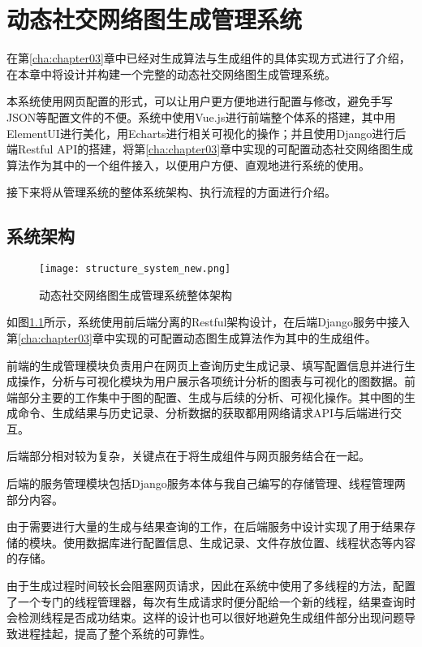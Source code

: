 
\chapter{动态社交网络图生成管理系统}
\label{cha:chapter04}

在第\ref{cha:chapter03}章中已经对生成算法与生成组件的具体实现方式进行了介绍，在本章中将设计并构建一个完整的动态社交网络图生成管理系统。

本系统使用网页配置的形式，可以让用户更方便地进行配置与修改，避免手写JSON等配置文件的不便。系统中使用Vue.js进行前端整个体系的搭建，其中用ElementUI进行美化，用Echarts进行相关可视化的操作；并且使用Django进行后端Restful API的搭建，将第\ref{cha:chapter03}章中实现的可配置动态社交网络图生成算法作为其中的一个组件接入，以便用户方便、直观地进行系统的使用。

接下来将从管理系统的整体系统架构、执行流程的方面进行介绍。

\section{系统架构}

\begin{figure}[H]
  \centering
  \texttt{[image: structure\_system\_new.png]}
  \caption{动态社交网络图生成管理系统整体架构}
  \label{fig:web_system}
\end{figure}

如图\ref{fig:web_system}所示，系统使用前后端分离的Restful架构设计，在后端Django服务中接入第\ref{cha:chapter03}章中实现的可配置动态图生成算法作为其中的生成组件。

前端的生成管理模块负责用户在网页上查询历史生成记录、填写配置信息并进行生成操作，分析与可视化模块为用户展示各项统计分析的图表与可视化的图数据。前端部分主要的工作集中于图的配置、生成与后续的分析、可视化操作。其中图的生成命令、生成结果与历史记录、分析数据的获取都用网络请求API与后端进行交互。

后端部分相对较为复杂，关键点在于将生成组件与网页服务结合在一起。

后端的服务管理模块包括Django服务本体与我自己编写的存储管理、线程管理两部分内容。

由于需要进行大量的生成与结果查询的工作，在后端服务中设计实现了用于结果存储的模块。使用数据库进行配置信息、生成记录、文件存放位置、线程状态等内容的存储。

由于生成过程时间较长会阻塞网页请求，因此在系统中使用了多线程的方法，配置了一个专门的线程管理器，每次有生成请求时便分配给一个新的线程，结果查询时会检测线程是否成功结束。这样的设计也可以很好地避免生成组件部分出现问题导致进程挂起，提高了整个系统的可靠性。

